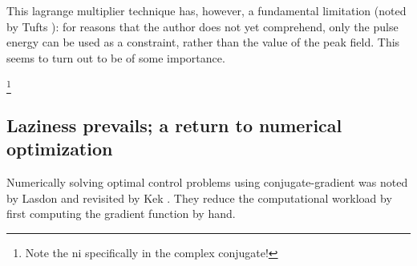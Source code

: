 \documentclass[paper.tex]{subfiles}
\begin{document}
%
%
%
%
%
%
%
%
%
%




%
%
%
%
%
%

This lagrange multiplier technique has, however, a fundamental limitation (noted by Tufts \cite{Optimum1964}): for reasons that the author does not yet comprehend, only the pulse energy can be used as a constraint, rather than the value of the peak field. This seems to turn out to be of some importance.


\footnote{Note the ni specifically in the complex conjugate!}


\subsection{Laziness prevails; a return to numerical optimization}

Numerically solving optimal control problems using conjugate-gradient was noted by Lasdon \cite{conjugate1967} and 
revisited by Kek \cite{Conjugate}. They reduce the computational workload by first computing the 
gradient function by hand.
\end{document}
